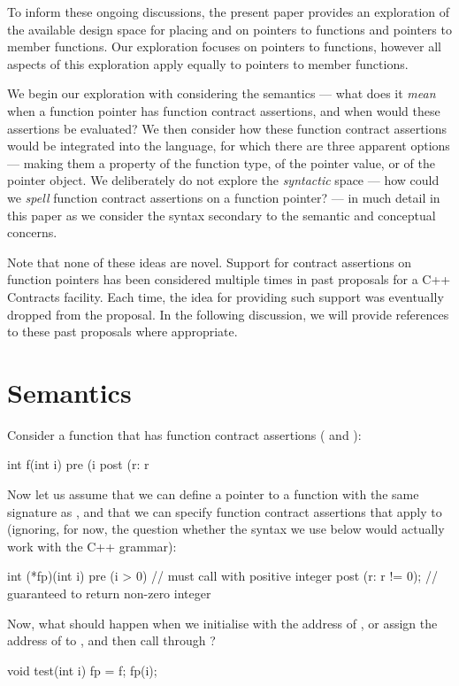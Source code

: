 To inform these ongoing discussions, the present paper provides an exploration of the available design space for placing  and  on pointers to functions and pointers to member functions. Our exploration focuses on pointers to functions, however all aspects of this exploration apply equally to pointers to member functions.

We begin our exploration with considering the semantics --- what does it \emph{mean} when a function pointer has function contract assertions, and when would these assertions be evaluated? We then consider how these function contract assertions would be integrated into the language, for which there are three apparent options --- making them a property of the function type, of the pointer value, or of the pointer object. We deliberately do not explore the \emph{syntactic} space --- how could we \emph{spell} function contract assertions on a function pointer? --- in much detail in this paper as we consider the syntax secondary to the semantic and conceptual concerns. 

Note that none of these ideas are novel. Support for contract assertions on function pointers has been considered multiple times in past proposals for a C++ Contracts facility. Each time, the idea for providing such support was eventually dropped from the proposal. In the following discussion, we will provide references to these past proposals where appropriate.

\section{Semantics}
Consider a function that has function contract assertions ( and ):
\begin{codeblock}
int f(int i)
  pre (i %
  post (r: r %
\end{codeblock}
Now let us assume that we can define a pointer  to a function with the same signature as , and that we can specify function contract assertions that apply to  (ignoring, for now, the question whether the syntax we use below would actually work with the C++ grammar):
\begin{codeblock}
int (*fp)(int i) 
  pre (i > 0)        // must call with positive integer
  post (r: r != 0);  // guaranteed to return non-zero integer
\end{codeblock}
Now, what should happen when we initialise  with the address of , or assign the address of  to , and then call  through ?
\begin{codeblock}  
void test(int i) {
  fp = f;    
  fp(i);
}
\end{codeblock}
